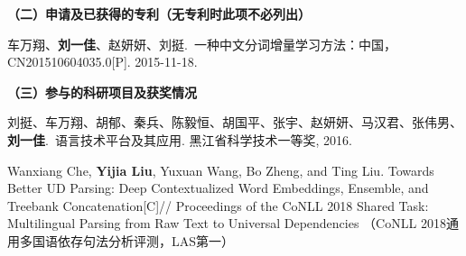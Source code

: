\begin{publication}
\noindent\textbf{（二）申请及已获得的专利（无专利时此项不必列出）}
\begin{publist}
\item 车万翔、\textbf{刘一佳}、赵妍妍、刘挺.~一种中文分词增量学习方法：中国，CN201510604035.0[P]. 2015-11-18.
\end{publist}

\noindent\textbf{（三）参与的科研项目及获奖情况}
\begin{publist}
\item 刘挺、车万翔、胡郁、秦兵、陈毅恒、胡国平、张宇、赵妍妍、马汉君、张伟男、\textbf{刘一佳}.~语言技术平台及其应用. 黑江省科学技术一等奖, 2016.
\item Wanxiang Che, \textbf{Yijia Liu}, Yuxuan Wang, Bo Zheng, and Ting Liu. Towards Better UD Parsing: Deep Contextualized Word Embeddings, Ensemble, and Treebank Concatenation[C]// Proceedings of the CoNLL 2018 Shared Task: Multilingual Parsing from Raw Text to Universal Dependencies （CoNLL 2018通用多国语依存句法分析评测，LAS第一）
\end{publist}
\end{publication}
